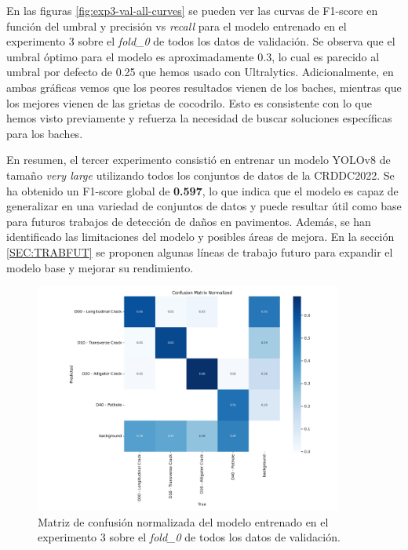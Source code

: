 En las figuras \ref{fig:exp3-val-all-curves} se pueden ver las curvas de F1-score en función del umbral y precisión vs \textit{recall} para el modelo entrenado en el experimento 3 sobre el \textit{fold\_0} de todos los datos de validación. Se observa que el umbral óptimo para el modelo es aproximadamente 0.3, lo cual es parecido al umbral por defecto de 0.25 que hemos usado con Ultralytics. Adicionalmente, en ambas gráficas vemos que los peores resultados vienen de los baches, mientras que los mejores vienen de las grietas de cocodrilo. Esto es consistente con lo que hemos visto previamente y refuerza la necesidad de buscar soluciones específicas para los baches.

En resumen, el tercer experimento consistió en entrenar un modelo YOLOv8 de tamaño \textit{very large} utilizando todos los conjuntos de datos de la CRDDC2022. Se ha obtenido un F1-score global de \textbf{0.597}, lo que indica que el modelo es capaz de generalizar en una variedad de conjuntos de datos y puede resultar útil como base para futuros trabajos de detección de daños en pavimentos. Además, se han identificado las limitaciones del modelo y posibles áreas de mejora. En la sección \ref{SEC:TRABFUT} se proponen algunas líneas de trabajo futuro para expandir el modelo base y mejorar su rendimiento.

\begin{figure}[H]
    \centering
    \includegraphics[width=0.9\textwidth]{img/exp3-val0-all-confusion_matrix_normalized.png}
    \caption{Matriz de confusión normalizada del modelo entrenado en el experimento 3 sobre el \textit{fold\_0} de todos los datos de validación.}
    \label{fig:exp3-val0-all-confusion_matrix_normalized}
\end{figure}

